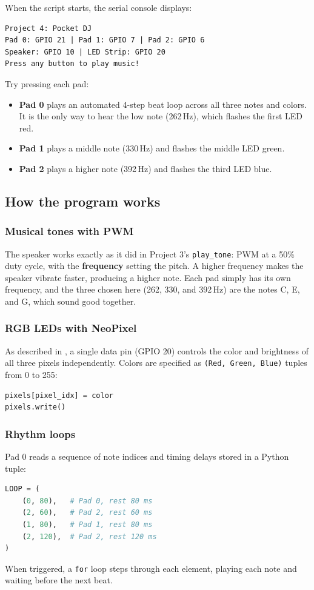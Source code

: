 When the script starts, the serial console displays:
\begin{verbatim}
Project 4: Pocket DJ
Pad 0: GPIO 21 | Pad 1: GPIO 7 | Pad 2: GPIO 6
Speaker: GPIO 10 | LED Strip: GPIO 20
Press any button to play music!
\end{verbatim}

Try pressing each pad:
\begin{itemize}
    \item \textbf{Pad 0} plays an automated 4-step beat loop across all three notes and colors. It is the
    only way to hear the low note (262\,Hz), which flashes the first LED red.
    \item \textbf{Pad 1} plays a middle note (330\,Hz) and flashes the middle LED green.
    \item \textbf{Pad 2} plays a higher note (392\,Hz) and flashes the third LED blue.
\end{itemize}

\subsection{How the program works}

\subsubsection{Musical tones with PWM}
The speaker works exactly as it did in Project 3's \texttt{play\_tone}: PWM at a 50\% duty cycle,
with the \textbf{frequency} setting the pitch. A higher frequency makes the speaker vibrate faster,
producing a higher note. Each pad simply has its own frequency, and the three chosen here (262, 330,
and 392\,Hz) are the notes C, E, and G, which sound good together.

\subsubsection{RGB LEDs with NeoPixel}
As described in , a single data pin (GPIO 20) controls the color and brightness of all three pixels independently.
Colors are specified as \texttt{(Red, Green, Blue)} tuples from 0 to 255:
\begin{lstlisting}[language=Python, caption=Lighting a pixel]
pixels[pixel_idx] = color
pixels.write()
\end{lstlisting}

\subsubsection{Rhythm loops}
Pad 0 reads a sequence of note indices and timing delays stored in a Python tuple:
\begin{lstlisting}[language=Python, caption=Rhythm loop sequence]
LOOP = (
    (0, 80),   # Pad 0, rest 80 ms
    (2, 60),   # Pad 2, rest 60 ms
    (1, 80),   # Pad 1, rest 80 ms
    (2, 120),  # Pad 2, rest 120 ms
)
\end{lstlisting}
When triggered, a \texttt{for} loop steps through each element, playing each note and waiting before the next beat.

